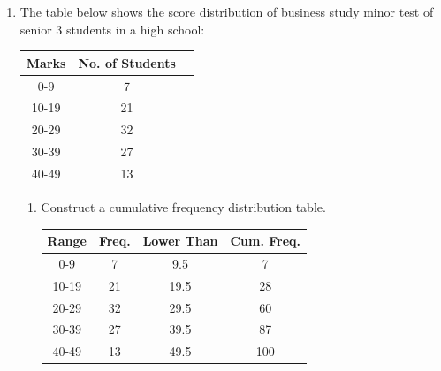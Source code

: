 \documentclass{report}
\begin{document}
\begin{multicols}{2}
\begin{enumerate}
    \item The table below shows the score distribution of business study minor test of
          senior 3 students in a high school:
          \begin{center}
            \begin{tabular}{|c|c|c|}
              \hline
              Marks & No. of Students \\
              \hline
              0-9   & 7               \\
              10-19 & 21              \\
              20-29 & 32              \\
              30-39 & 27              \\
              40-49 & 13              \\
              \hline
            \end{tabular}
          \end{center}
          \begin{enumerate}
            \item Construct a cumulative frequency distribution table. \sol{}
                  \begin{center}
                    \begin{tabular}{|c|c|c|c|}
                      \hline
                      Range & Freq. & Lower Than & Cum. Freq. \\
                      \hline
                      0-9   & 7     & 9.5        & 7          \\
                      10-19 & 21    & 19.5       & 28         \\
                      20-29 & 32    & 29.5       & 60         \\
                      30-39 & 27    & 39.5       & 87         \\
                      40-49 & 13    & 49.5       & 100        \\
                      \hline
                    \end{tabular}
                  \end{center}


\end{enumerate}
\end{enumerate}
\end{multicols}
\end{document}
